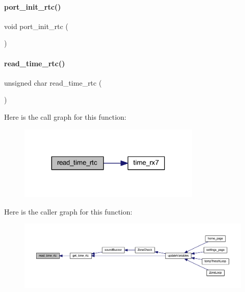 \mbox{\label{a00017_a4144a5333b1a934957b78e4b2d0f8695}} 
\paragraph{port\+\_\+init\+\_\+rtc()}
{\footnotesize\ttfamily void port\+\_\+init\+\_\+rtc (\begin{DoxyParamCaption}{ }\end{DoxyParamCaption})}

\mbox{\label{a00017_add06d1f93d90576fa369c2401c1d4aed}} 
\paragraph{read\+\_\+time\+\_\+rtc()}
{\footnotesize\ttfamily unsigned char read\+\_\+time\+\_\+rtc (\begin{DoxyParamCaption}{ }\end{DoxyParamCaption})}

Here is the call graph for this function\+:
\nopagebreak
\begin{figure}[H]
\begin{center}
\leavevmode
\includegraphics[width=246pt]{a00017_add06d1f93d90576fa369c2401c1d4aed_cgraph}
\end{center}
\end{figure}
Here is the caller graph for this function\+:
\nopagebreak
\begin{figure}[H]
\begin{center}
\leavevmode
\includegraphics[width=350pt]{a00017_add06d1f93d90576fa369c2401c1d4aed_icgraph}
\end{center}
\end{figure}
\mbox{\label{a00017_af48611801cb8ae30f21f4263183355a4}} 

